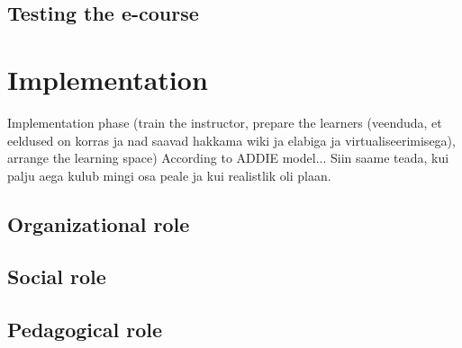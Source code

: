\subsection{Testing the e-course}

\section{Implementation}

Implementation phase (train the instructor, prepare the learners (veenduda, et eeldused on korras ja nad saavad hakkama wiki ja elabiga ja virtualiseerimisega), arrange the learning space)
According to \gls{ADDIE} model...
Siin saame teada, kui palju aega kulub mingi osa peale ja kui realistlik oli plaan.

\subsection{Organizational role}

\subsection{Social role}

\subsection{Pedagogical role}
